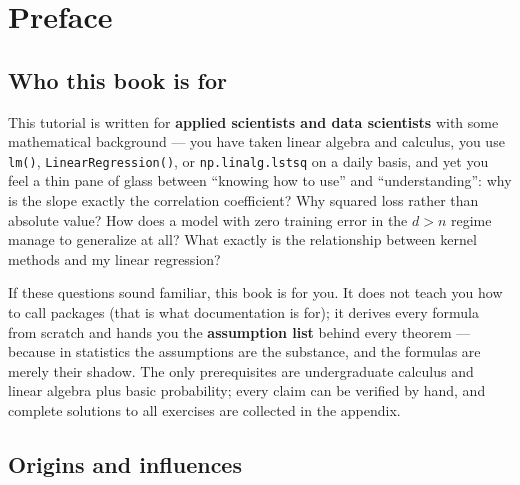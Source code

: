 \section*{Preface}\label{sec:preface}

\subsection*{Who this book is for}

This tutorial is written for \textbf{applied scientists and data scientists} with some mathematical background --- you have taken linear algebra and calculus, you use \texttt{lm()}, \texttt{LinearRegression()}\allowbreak, or \texttt{np.linalg.lstsq} on a daily basis, and yet you feel a thin pane of glass between ``knowing how to use'' and ``understanding'': why is the slope exactly the correlation coefficient? Why squared loss rather than absolute value? How does a model with zero training error in the $d > n$ regime manage to generalize at all? What exactly is the relationship between kernel methods and my linear regression?

If these questions sound familiar, this book is for you. It does not teach you how to call packages (that is what documentation is for); it derives every formula from scratch and hands you the \textbf{assumption list} behind every theorem --- because in statistics the assumptions are the substance, and the formulas are merely their shadow. The only prerequisites are undergraduate calculus and linear algebra plus basic probability; every claim can be verified by hand, and complete solutions to all exercises are collected in the appendix.

\subsection*{Origins and influences}

